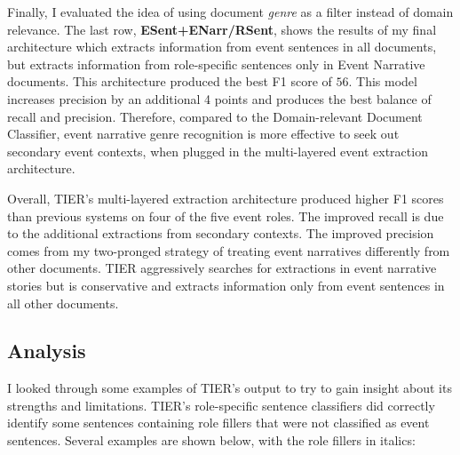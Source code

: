 


Finally, I evaluated the idea of using document {\it genre} as a
filter instead of domain relevance. The last row,
\textbf{ESent+ENarr/RSent}, shows the results of my final
architecture which extracts information from event sentences in all
documents, but extracts information from role-specific sentences only
in Event Narrative documents. This architecture produced the
best F1 score of $56$. This model increases 
precision by an additional 4 points and produces
the best balance of recall and precision. 
Therefore, compared to the Domain-relevant Document Classifier, 
event narrative genre recognition is more 
effective to seek out secondary event contexts, when 
plugged in the multi-layered event extraction architecture.


Overall, TIER's multi-layered extraction  architecture produced higher F1
scores than previous systems on four of the five event roles. 
The improved recall is due to the additional extractions from secondary
contexts. The improved precision comes from my two-pronged strategy of
treating event narratives differently from other documents. TIER
aggressively searches for extractions in event narrative stories but is
conservative and extracts information only from event
sentences in all other documents.  


\subsection{Analysis}
\label{analysis}


I looked through some examples of TIER's output to try to gain
insight about its strengths and limitations. TIER's role-specific
sentence classifiers did correctly identify some sentences containing
role fillers that were not classified as event sentences. Several
examples are shown below, with the role fillers in italics:  \\


